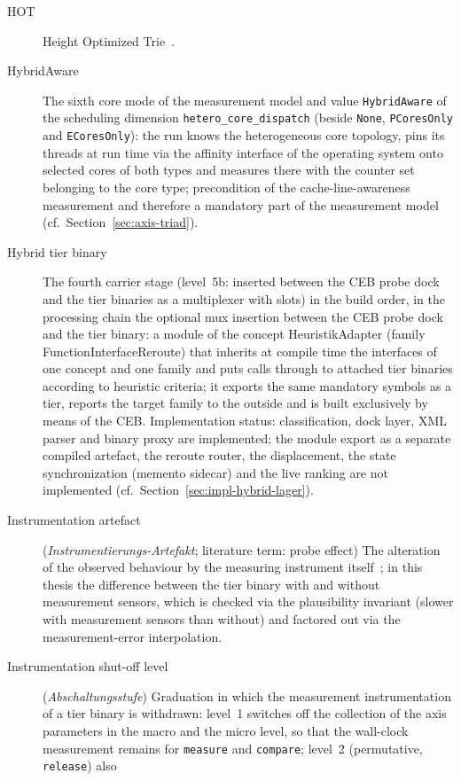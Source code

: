 \begin{description}
  \item[HOT] Height Optimized Trie~\cite{binna2018hot}.
  \item[HybridAware] The sixth core mode of the measurement model and value \texttt{HybridAware}
  of the scheduling dimension \texttt{hetero\_core\_dispatch} (beside \texttt{None},
  \texttt{PCoresOnly} and \texttt{ECoresOnly}): the run knows the heterogeneous core topology, pins
  its threads at run time via the affinity interface of the operating system onto selected cores of
  both types and measures there with the counter set belonging to the core type; precondition of
  the cache-line-awareness measurement and therefore a mandatory part of the measurement model
  (cf.\ Section~\ref{sec:axis-triad}).
  \item[Hybrid tier binary] The fourth carrier stage (level~5b: inserted between the CEB probe dock and
  the tier binaries as a multiplexer with slots) in the build order, in the processing chain the
  optional mux insertion between the CEB probe dock and the tier binary: a module of the concept
  HeuristikAdapter
  (family FunctionInterfaceReroute) that inherits at compile time the interfaces of one concept and
  one family and puts calls through to attached tier binaries according to heuristic criteria; it
  exports the same mandatory symbols as a tier, reports the target family to the outside and is
  built exclusively by means of the CEB\@. Implementation status: classification, dock layer, XML
  parser and binary proxy are implemented; the module export as a separate compiled artefact, the
  reroute router, the displacement, the state synchronization (memento sidecar) and the live
  ranking are not implemented (cf.\ Section~\ref{sec:impl-hybrid-lager}).
  \item[Instrumentation artefact] (\emph{Instrumentierungs-Artefakt}; literature term: probe
  effect) The alteration of the observed behaviour by the measuring instrument
  itself~\cite{gait1986probe}; in this thesis the difference between the tier binary with and
  without measurement sensors, which is checked via the plausibility invariant (slower with
  measurement sensors than without) and factored out via the measurement-error interpolation.
  \item[Instrumentation shut-off level] (\emph{Abschaltungsstufe}) Graduation in which the
  measurement instrumentation of a tier binary is withdrawn: level~1 switches off the collection
  of the axis parameters in the macro and the micro level, so that the wall-clock measurement
  remains for \texttt{measure} and \texttt{compare}; level~2 (permutative, \texttt{release}) also

\end{description}
